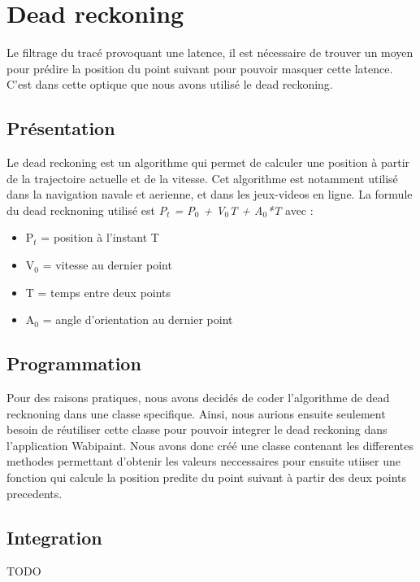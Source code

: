 \chapter{Dead reckoning}
Le filtrage du tracé provoquant une latence, il est nécessaire de trouver un moyen pour prédire la position du point suivant pour pouvoir masquer cette latence. C'est dans cette optique que nous avons utilisé le dead reckoning.

\section{Présentation}
Le dead reckoning est un algorithme qui permet de calculer une position à partir de la trajectoire actuelle et de la vitesse. Cet algorithme est notamment utilisé dans la navigation navale et aerienne, et dans les jeux-videos en ligne. 
La formule du dead recknoning utilisé est \textit{P$_{t}$ = P$_{0}$ + V$_{0}$T + A$_{0}$*T} avec :

\begin{itemize}
	\item P$_{t}$ = position à l'instant T
	\item V$_{0}$ = vitesse au dernier point
	\item T = temps entre deux points
	\item A$_{0}$ = angle d'orientation au dernier point
\end{itemize}

	
\section{Programmation}
Pour des raisons pratiques, nous avons decidés de coder l'algorithme de dead recknoning dans une classe specifique. Ainsi, nous aurions ensuite seulement besoin de réutiliser cette classe pour pouvoir integrer le dead reckoning dans l'application Wabipaint.
Nous avons donc créé une classe contenant les differentes methodes permettant d'obtenir les valeurs neccessaires pour ensuite utiiser une fonction qui calcule la position predite du point suivant à partir des deux points precedents. 

\section{Integration}
TODO





